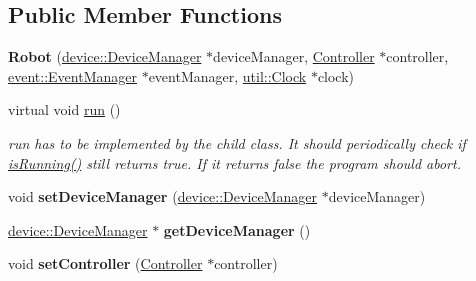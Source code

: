 \subsection*{Public Member Functions}
\begin{DoxyCompactItemize}
\item 
\hypertarget{classdrobot_1_1robot_1_1Robot_a8f352efdddf1a1d76d3740032964e893}{{\bfseries Robot} (\hyperlink{classdrobot_1_1device_1_1DeviceManager}{device\-::\-Device\-Manager} $\ast$device\-Manager, \hyperlink{classdrobot_1_1robot_1_1Controller}{Controller} $\ast$controller, \hyperlink{classdrobot_1_1event_1_1EventManager}{event\-::\-Event\-Manager} $\ast$event\-Manager, \hyperlink{classdrobot_1_1util_1_1Clock}{util\-::\-Clock} $\ast$clock)}\label{classdrobot_1_1robot_1_1Robot_a8f352efdddf1a1d76d3740032964e893}

\item 
\hypertarget{classdrobot_1_1robot_1_1Robot_a47aad1b040e0c9a1ff8938e13d45473b}{virtual void \hyperlink{classdrobot_1_1robot_1_1Robot_a47aad1b040e0c9a1ff8938e13d45473b}{run} ()}\label{classdrobot_1_1robot_1_1Robot_a47aad1b040e0c9a1ff8938e13d45473b}

\begin{DoxyCompactList}\small\item\em run has to be implemented by the child class. It should periodically check if \hyperlink{classdrobot_1_1program_1_1Runnable_ab22aef578839f56051702094b6f768df}{is\-Running()} still returns true. If it returns false the program should abort. \end{DoxyCompactList}\item 
\hypertarget{classdrobot_1_1robot_1_1Robot_a398ddace28a74ad646a4e390df654c6e}{void {\bfseries set\-Device\-Manager} (\hyperlink{classdrobot_1_1device_1_1DeviceManager}{device\-::\-Device\-Manager} $\ast$device\-Manager)}\label{classdrobot_1_1robot_1_1Robot_a398ddace28a74ad646a4e390df654c6e}

\item 
\hypertarget{classdrobot_1_1robot_1_1Robot_a2aae6dac03338e0af23afc4059cad388}{\hyperlink{classdrobot_1_1device_1_1DeviceManager}{device\-::\-Device\-Manager} $\ast$ {\bfseries get\-Device\-Manager} ()}\label{classdrobot_1_1robot_1_1Robot_a2aae6dac03338e0af23afc4059cad388}

\item 
\hypertarget{classdrobot_1_1robot_1_1Robot_acbd72c93a7535574ccd8a53018b7ac73}{void {\bfseries set\-Controller} (\hyperlink{classdrobot_1_1robot_1_1Controller}{Controller} $\ast$controller)}\label{classdrobot_1_1robot_1_1Robot_acbd72c93a7535574ccd8a53018b7ac73}


\end{DoxyCompactItemize}
